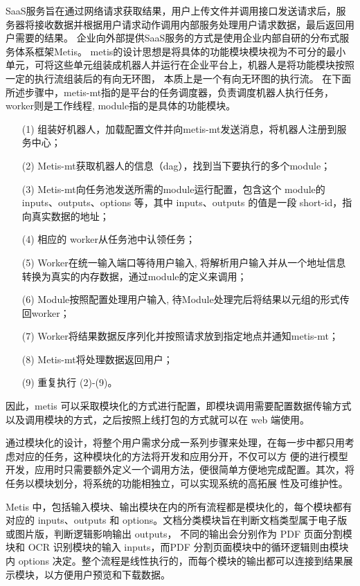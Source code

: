 SaaS服务旨在通过网络请求获取结果，用户上传文件并调用接口发送请求后，服务器将接收数据并根据用户请求动作调用内部服务处理用户请求数据，最后返回用户需要的结果。
企业向外部提供SaaS服务的方式是使用企业内部自研的分布式服务体系框架Metis。
metis的设计思想是将具体的功能模块模块视为不可分的最小单元，可将这些单元组装成机器人并运行在企业平台上，机器人是将功能模块按照一定的执行流组装后的有向无环图，
本质上是一个有向无环图的执行流。
在下面所述步骤中，metis-mt指的是平台的任务调度器，负责调度机器人执行任务，worker则是工作线程, module指的是具体的功能模块。

\begin{enumerate}
    \item[(1)] 组装好机器人，加载配置文件并向metis-mt发送消息，将机器人注册到服务中心；
    \item[(2)] Metis-mt获取机器人的信息（dag），找到当下要执行的多个module；
    \item[(3)] Metis-mt向任务池发送所需的module运行配置，包含这个 module的 inputs、outputs、options 等，其中 inputs、outputs 的值是一段 short-id，指向真实数据的地址；
    \item[(4)] 相应的 worker从任务池中认领任务；
    \item[(5)] Worker在统一输入端口等待用户输入, 将解析用户输入并从一个地址信息转换为真实的内存数据，通过module的定义来调用；
    \item[(6)] Module按照配置处理用户输入, 待Module处理完后将结果以元组的形式传回worker；
    \item[(7)] Worker将结果数据反序列化并按照请求放到指定地点并通知metis-mt；
    \item[(8)] Metis-mt将处理数据返回用户；
    \item[(9)] 重复执行 (2)-(9)。
\end{enumerate}


因此，metis 可以采取模块化的方式进行配置，即模块调用需要配置数据传输方式以及调用模块的方式，之后按照上线打包的方式就可以在 web 端使用。

通过模块化的设计，将整个用户需求分成一系列步骤来处理，在每一步中都只用考虑对应的任务，这种模块化的方法将开发和应用分开，不仅可以方
便的进行模型开发，应用时只需要额外定义一个调用方法，便很简单方便地完成配置。其次，将任务以模块划分，将系统的功能相独立，可以实现系统的高拓展
性及可维护性。

Metis 中，包括输入模块、输出模块在内的所有流程都是模块化的，每个模块都有对应的 inputs、outputs 和 options。文档分类模块旨在判断文档类型属于电子版或图片版，判断逻辑影响输出 outputs，
不同的输出会分别作为 PDF 页面分割模块和 OCR 识别模块的输入 inputs，而PDF 分割页面模块中的循环逻辑则由模块内 options 决定。整个流程是线性执行的，而每个模块的输出都可以连接到结果展示模块，以方便用户预览和下载数据。

